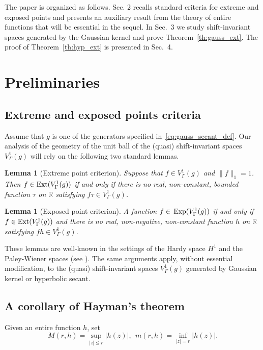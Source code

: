 \documentclass[12pt]{amsart}
\numberwithin{equation}{section}
\theoremstyle{plain}
\newtheorem{lemma}[theorem]{Lemma}
\theoremstyle{definition}
\newcommand{\R}{{\mathbb R}} \newcommand{\Q}{{\mathbb Q}} \newcommand{\Z}{{\mathbb Z}} \newcommand{\N}{{\mathbb N}}
\newcommand{\ext}{{\rm Ext}}
\newcommand{\expo}{\,{\rm Exp}}
\begin{document}
The paper is organized as follows. Sec. 2 recalls  standard criteria for extreme and exposed points and presents an auxiliary result from the theory of entire functions that will be essential in the sequel. In Sec.~3 we study shift-invariant spaces generated by the Gaussian kernel and prove Theorem~\ref{th:gauss_ext}. The proof of Theorem~\ref{th:hyp_ext} is presented in Sec.~4. 

\section{Preliminaries}

\subsection{Extreme and exposed points criteria}

Assume that $g$  is one of the generators specified in~\eqref{eq:gauss_secant_def}.
Our analysis of the geometry of the unit ball of the (quasi) shift-invariant spaces $V^1_\Gamma(g)$
 will rely on the following two standard lemmas.
\begin{lemma}[Extreme point criterion]\label{h_lemma}
Suppose that $f \in V^1_{\Gamma}(g)$ and $\|f\|_{1} = 1$.
Then $f\in \ext(V^1_{\Gamma}(g))$ if and only if there is no real, non-constant, bounded  function $\tau$ on $\R$ satisfying $f \tau \in V^1_{\Gamma}(g)$.
\end{lemma}
\begin{lemma}[Exposed point criterion]\label{exp_lemma}
A function  $f\in{\rm \expo}(V^1_{\Gamma}(g))$ if and only if  $f\in{\rm \ext}(V^1_{\Gamma}(g))$ and there is no real, non-negative,  non-constant function $h$ on $\R$ satisfying $fh\in V^1_{\Gamma}(g)$.
\end{lemma}

These lemmas are well-known in the settings of the Hardy space $H^1$ and the Paley-Wiener spaces (see \cite{MR1783617, MR410387}). The same arguments apply, without essential modification, to the (quasi) shift-invariant spaces $V^1_{\Gamma}(g)$ generated by Gaussian kernel or hyperbolic secant.

 
\subsection{A corollary of Hayman's theorem}
Given an entire function $h$, set
\begin{equation}\label{eq:m_M_def}
M(r,h)=\sup_{|z|\leq r}|h(z)|,\ \ m(r,h)=\inf_{|z|=r}|h(z)|.  
\end{equation}
\end{document}

